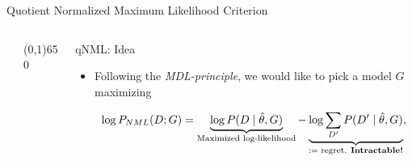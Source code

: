 \documentclass[final]{beamer}
\newcommand{\heading}[1]{\alert{\large #1}\\}
\theoremstyle{plain}
\begin{document}
\begin{frame}{}
\begin{block}{Quotient Normalized Maximum Likelihood Criterion}
\begin{columns}[T]
\begin{column}{0.18\textwidth}
   \end{column}
   
   \begin{column}{0.005\textwidth}\linethickness{0.3ex} %
      \color{myPurple} \line(0,1){650}
   \end{column} %
   
   \begin{column}{0.3\textwidth} %
	\heading{qNML: Idea}
	\vspace*{12pt}
	\begin{itemize}
	\item Following the \textit{MDL-principle}, we would like to pick a model $G$ maximizing

	\begin{equation}
	\log P_{NML}(D;G) = \underbrace{\log P(D \mid \hat\theta , G)}_{\text{Maximized log-likelihood}} - \underbrace{\log \sum_{D'}P(D' \mid \hat  \theta,G)}_{:= \text{ regret. } \textbf{Intractable!}}, \notag
	\end{equation}%


\end{itemize}
\end{column}
\end{columns}
\end{block}
\end{frame}
\end{document}

